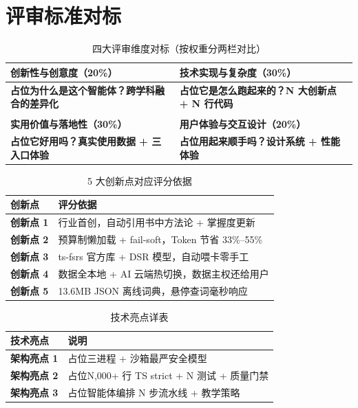\documentclass[12pt,a4paper,nomath]{harryopo-report}
\begin{document}
\section{评审标准对标}
\label{sec:review}
\begin{table}[htbp]
\centering
\begin{tabularx}{\textwidth}{>{\bfseries}X >{\bfseries}X}
\toprule
\textbf{创新性与创意度（20\%）} & \textbf{技术实现与复杂度（30\%）} \\
\midrule
{占位}为什么是这个智能体？跨学科融合的差异化 & {占位}它是怎么跑起来的？N 大创新点 + N 行代码 \\
\bottomrule
\\
\textbf{实用价值与落地性（30\%）} & \textbf{用户体验与交互设计（20\%）} \\
\midrule
{占位}它好用吗？真实使用数据 + 三入口体验 & {占位}用起来顺手吗？设计系统 + 性能体验 \\
\bottomrule
\end{tabularx}
\caption{四大评审维度对标（按权重分两栏对比）}
\label{tab:review-detail}
\end{table}

\begin{table}[htbp]
\centering
\begin{tabularx}{\textwidth}{>{\bfseries}l X}
\toprule
\textbf{创新点} & \textbf{评分依据} \\
\midrule
创新点 1 & 行业首创，自动引用书中方法论 + 掌握度更新 \\
创新点 2 & 预算制懒加载 + fail-soft，Token 节省 33\%--55\% \\
创新点 3 & ts-fsrs 官方库 + DSR 模型，自动喂卡零手工 \\
创新点 4 & 数据全本地 + AI 云端热切换，数据主权还给用户 \\
创新点 5 & 13.6MB JSON 离线词典，悬停查词毫秒响应 \\
\bottomrule
\end{tabularx}
\caption{5 大创新点对应评分依据}
\label{tab:innovation}
\end{table}

\begin{table}[htbp]
\centering
\begin{tabularx}{\textwidth}{>{\bfseries}l X}
\toprule
\textbf{技术亮点} & \textbf{说明} \\
\midrule
架构亮点 1 & {占位}三进程 + 沙箱最严安全模型 \\
架构亮点 2 & {占位}N,000+ 行 TS strict + N 测试 + 质量门禁 \\
架构亮点 3 & {占位}智能体编排 N 步流水线 + 教学策略 \\
\bottomrule
\end{tabularx}
\caption{技术亮点详表}
\label{tab:tech-highlight}
\end{table}
\end{document}

